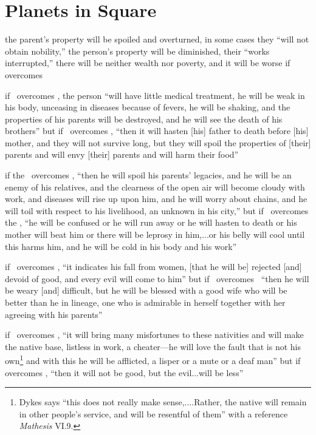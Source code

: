 \section{Planets in Square}
\begin{description}[style=multiline,leftmargin=1.5cm]
\item[\Saturn\Square\Jupiter] the parent's property will be spoiled and overturned, in some cases they ``will not obtain nobility,'' the person's property will be diminished, their ``works interrupted,'' there will be neither wealth nor poverty, and it will be worse if \Saturn\, overcomes \Jupiter

\item[\Saturn\Square\Mars] if \Saturn\, overcomes \Mars, the person ``will have little medical treatment, he will be weak in his body, unceasing in diseases because of fevers, he will be shaking, and the properties of his parents will be destroyed, and he will see the death of his brothers'' but if \Mars\, overcomes \Saturn, ``then it will hasten [his] father to death before [his] mother, and they will not survive long, but they will spoil the properties of [their] parents and will envy [their] parents and will harm their food''

\item[\Saturn\Square\Sun] if the \Sun\, overcomes \Saturn, ``then he will spoil his parents' legacies, and he will be an enemy of his relatives, and the clearness of the open air will become cloudy with work, and diseases will rise up upon him, and he will worry about chains, and he will toil with respect to his livelihood, an unknown in his city,'' but if \Saturn\, overcomes the \Sun, ``he will be confused or he will run away or he will hasten to death or his mother will beat him or there will be leprosy in him,...or his belly will cool until this harms him, and he will be cold in his body and his work''

\item[\Saturn\Square\Venus] if \Saturn\, overcomes \Venus, ``it indicates his fall from women, [that he will be] rejected [and] devoid of good, and every evil will come to him'' but if \Venus\, overcomes \Saturn\, ``then he will be weary [and] difficult, but he will be blessed with a good wife who will be better than he in lineage, one who is admirable in herself together with her agreeing with his parents''

\item[\Saturn\Square\Mercury] if \Saturn\, overcomes \Mercury, ``it will bring many misfortunes to these nativities and will make the native base, listless in work, a cheater---he will love the fault that is not his own\footnote{Dykes says ``this does not really make sense,....Rather, the native will remain in other people's service, and will be resentful of them'' with a reference \textsl{Mathesis} VI.9.} and with this he will be afflicted, a lisper or a mute or a deaf man'' but if \Mercury\, overcomes \Saturn, ``then it will not be good, but the evil...will be less''


\end{description}
